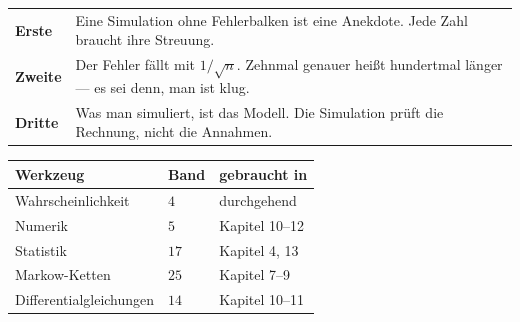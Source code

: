 \begin{warnung}
\begin{center}
{\small
\renewcommand{\arraystretch}{1.55}
\begin{tabular}{@{}P{2.2cm}P{6.4cm}@{}}
\toprule
\textbf{Erste} & Eine Simulation ohne Fehlerbalken ist eine Anekdote. Jede Zahl braucht ihre Streuung.\\
\textbf{Zweite} & Der Fehler fällt mit $1/\sqrt n$. Zehnmal genauer heißt hundertmal länger --- es sei denn, man ist klug.\\
\textbf{Dritte} & Was man simuliert, ist das Modell. Die Simulation prüft die Rechnung, nicht die Annahmen.\\
\bottomrule
\end{tabular}}
\end{center}

\begin{center}
\begin{minipage}{0.88\textwidth}
\end{minipage}
\end{center}
\end{warnung}

\begin{merksatz}
\begin{center}
{\small
\renewcommand{\arraystretch}{1.48}
\begin{tabular}{@{}P{3.4cm}P{1.4cm}P{2.8cm}@{}}
\toprule
\textbf{Werkzeug} & \textbf{Band} & \textbf{gebraucht in}\\
\midrule
Wahrscheinlichkeit & $4$ & durchgehend\\
Numerik & $5$ & Kapitel 10--12\\
Statistik & $17$ & Kapitel 4, 13\\
Markow-Ketten & $25$ & Kapitel 7--9\\
Differential\-gleichungen & $14$ & Kapitel 10--11\\
\bottomrule
\end{tabular}}
\end{center}

\begin{center}
\begin{minipage}{0.88\textwidth}
\end{minipage}
\end{center}
\end{merksatz}
